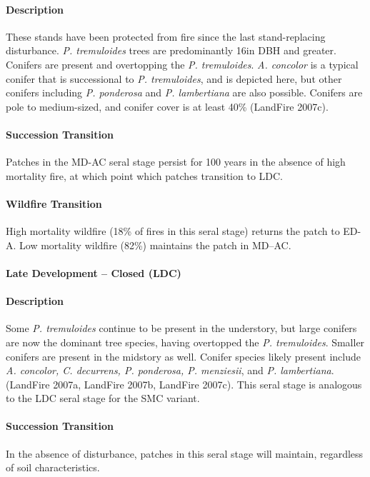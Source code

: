 \paragraph{Description} These stands have been protected from fire since the last stand-replacing disturbance. \emph{P. tremuloides} trees are predominantly 16in DBH and greater. Conifers are present and overtopping the \emph{P. tremuloides}. \emph{A. concolor} is a typical conifer that is successional to \emph{P. tremuloides}, and is depicted here, but other conifers including \emph{P. ponderosa} and \emph{P. lambertiana} are also possible. Conifers are pole to medium-sized, and conifer cover is at least 40\% (LandFire 2007c).

\paragraph{Succession Transition} Patches in the MD-AC seral stage persist for 100 years in the absence of high mortality fire, at which point which patches transition to LDC. 

\paragraph{Wildfire Transition} High mortality wildfire (18\% of fires in this seral stage) returns the patch to ED-A. Low mortality wildfire (82\%) maintains the patch in MD–AC.

\noindent\hrulefill

\paragraph{Late Development – Closed (LDC)}

\paragraph{Description} Some \emph{P. tremuloides} continue to be present in the understory, but large conifers are now the dominant tree species, having overtopped the \emph{P. tremuloides}. Smaller conifers are present in the midstory as well. Conifer species likely present include \emph{A. concolor, C. decurrens, P. ponderosa, P. menziesii}, and \emph{P. lambertiana}. (LandFire 2007a, LandFire 2007b, LandFire 2007c). This seral stage is analogous to the LDC seral stage for the SMC variant.

\paragraph{Succession Transition} In the absence of disturbance, patches in this seral stage will maintain, regardless of soil characteristics.

